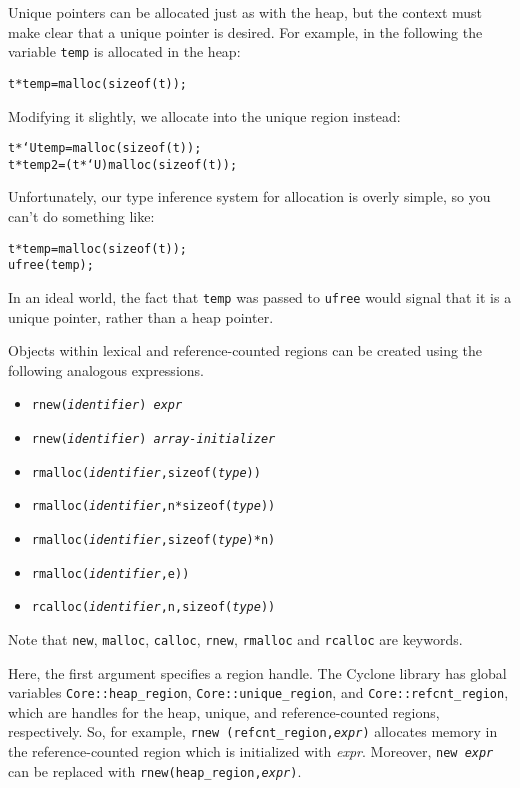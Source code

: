 Unique pointers can be allocated just as with the heap, but the context must
make clear that a unique pointer is desired.  For example, in the following
the variable \texttt{temp} is allocated in the heap:
\begin{alltt}
  t * temp = malloc(sizeof(t));
\end{alltt}
Modifying it slightly, we allocate into the unique region instead:
\begin{alltt}
  t *`U temp  =        malloc(sizeof(t));
  t *   temp2 = (t *`U)malloc(sizeof(t));
\end{alltt}
Unfortunately, our type inference system for allocation is overly simple, so
you can't do something like:
\begin{alltt}
  t * temp = malloc(sizeof(t));
  ufree(temp);
\end{alltt}
In an ideal world, the fact that \texttt{temp} was passed to \texttt{ufree}
would signal that it is a unique pointer, rather than a heap pointer.

Objects within lexical and reference-counted regions can be created using
the following analogous expressions.
\begin{itemize}
\item \texttt{rnew({\it identifier}) {\it expr}}
\item \texttt{rnew({\it identifier}) {\it array-initializer}}
\item \texttt{rmalloc({\it identifier},sizeof({\it type}))}
\item \texttt{rmalloc({\it identifier},n*sizeof({\it type}))}
\item \texttt{rmalloc({\it identifier},sizeof({\it type})*n)}
\item \texttt{rmalloc({\it identifier},e))}
\item \texttt{rcalloc({\it identifier},n,sizeof({\it type}))}
\end{itemize}
Note that \texttt{new}, \texttt{malloc}, \texttt{calloc}, 
\texttt{rnew}, \texttt{rmalloc} and \texttt{rcalloc} are keywords.

Here, the first argument specifies a region handle.  The Cyclone library has
global variables \texttt{Core::heap_region}, \texttt{Core::unique_region},
and \texttt{Core::refcnt\_region}, which are handles for the heap, unique,
and reference-counted regions, respectively.  So, for example, \texttt{rnew
(refcnt_region,{\it expr})} allocates memory in the reference-counted region
which is initialized with {\it expr}.  Moreover, \texttt{new {\it expr}} can
be replaced with \texttt{rnew(heap_region,{\it expr})}.

